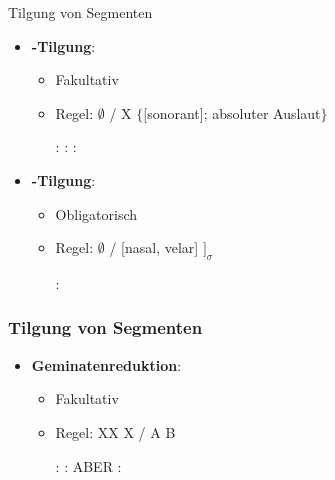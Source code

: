 \begin{frame}{Tilgung von Segmenten}

\begin{itemize}
	\item \textbf{-Tilgung}:
	
	\begin{itemize}
		\item Fakultativ
		\item Regel:  \ras $\emptyset$ / X \underline{\quad} $\{$[sonorant]; absoluter Auslaut$\}$
	
	\eal
		\ex {}:  \ras \textipa{[ge:n]}
		\ex {}:  \ras \textipa{[k\t{aU}f]}
		\ex {}:  \ras {}
	\zl
	
	\end{itemize}

	\item \textbf{-Tilgung}:
	
	\begin{itemize}
		\item Obligatorisch
		\item Regel:  \ras $\emptyset$ / [nasal, velar] \underline{\quad} $]_\sigma$
		
		\ea {}:  \ras {}
		\z
		
	\end{itemize}
			
\end{itemize}

\end{frame}



\begin{frame}
\frametitle{Tilgung von Segmenten}

\begin{itemize}
	\item \textbf{Geminatenreduktion}:

	\begin{itemize}
		\item Fakultativ
		\item Regel: XX \ras X / A \underline{\quad} B

	\eal
		\ex {}:  \ras {}
		\ex {}:  \ras \textipa{[SI\.fa:{\textscr}t]}
		\ex ABER :  \ras \textipa{[\t{ts}o:.Po.p5]}
	\zl
	
	\end{itemize}
	
\end{itemize}

\end{frame}



